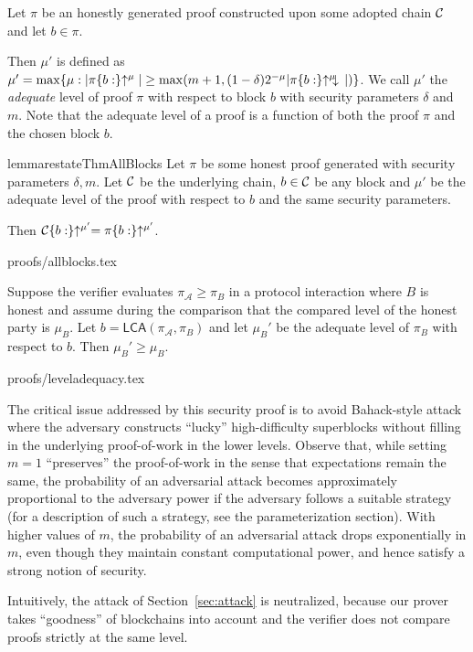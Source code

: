 \begin{definition}
Let $\pi$ be an honestly generated proof constructed upon some adopted chain
$\mathcal{C}$ and let $b \in \pi$.

Then $\mu'$ is defined as  $\mu' = \max\{\mu: |\pi\{b:\}\negthickspace\uparrow^\mu| \geq
\max(m + 1, (1 - \delta)2^{-\mu}|\pi\{b:\}\negthickspace\uparrow^\mu\negthickspace\downarrow\,|)\}$.
We call $\mu'$ the \textit{adequate} level of proof $\pi$ with respect to
block $b$ with security parameters $\delta$ and $m$. Note that the adequate
level of a proof is a function of both the proof $\pi$ and the chosen block $b$.
\end{definition}

\begin{restatable}{lemma}{restateThmAllBlocks}\label{lem.allblocks}
Let $\pi$ be some honest proof generated with security parameters $\delta, m$.
Let $\mathcal{C}$ be the underlying chain, $b \in \mathcal{C}$ be any block and $\mu'$ be
the adequate level of the proof with respect to $b$ and the same security
parameters.

Then $\mathcal{C}\{b:\}\negthickspace\uparrow^{\mu'} = \pi\{b:\}\negthickspace\uparrow^{\mu'}$.
\end{restatable}
{proofs/allblocks.tex}

\begin{lemma}
Suppose the verifier evaluates $\pi_\mathcal{A} \geq \pi_B$ in a protocol
interaction where $B$ is honest and assume during the comparison that the
compared level of the honest party is $\mu_B$. Let $b =
\textsf{LCA}(\pi_\mathcal{A}, \pi_B)$ and let $\mu_B'$ be the adequate
level of $\pi_B$ with respect to $b$. Then $\mu_B' \geq \mu_B$.
\end{lemma}
{proofs/leveladequacy.tex}



\begin{remark}
\label{rmk.variance}
The critical issue addressed by this security proof is to avoid Bahack-style
attack \cite{bahack} where the adversary constructs ``lucky'' high-difficulty
superblocks without filling in the underlying proof-of-work in the lower
levels. Observe that, while setting $m = 1$ ``preserves'' the proof-of-work in
the sense that expectations remain the same, the probability of an adversarial
attack becomes approximately proportional to the adversary power if the
adversary follows a suitable strategy (for a description of such a strategy,
see the parameterization section). With higher values of $m$, the probability of
an adversarial attack drops exponentially in $m$, even though they maintain constant
computational power, and hence satisfy a strong notion of security.
\end{remark}

\begin{remark}
Intuitively, the attack of Section~\ref{sec:attack} is neutralized, because
our prover takes ``goodness'' of blockchains into account and the verifier
does not compare proofs strictly at the same level.
\end{remark}
